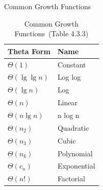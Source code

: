 \documentclass[handout]{beamer}
\begin{document}
        \begin{frame}[c,shrink]{Common Growth Functions}
            \begin{table}[tp]%
                \caption{Common Growth Functions\ (Table 4.3.3)}
                \label{cgf}\centering%
                \begin{tabular}{ll}
                    \hline%
                    Theta Form             & Name         \\\hline%
                    $\Theta(1)         $   & Constant     \\
                    $\Theta(\lg\lg{n}) $   & Log log      \\
                    $\Theta(\lg{n})    $   & Log          \\
                    $\Theta(n)         $   & Linear       \\
                    $\Theta(n\lg{n})   $   & n log n      \\
                    $\Theta(n_2)       $   & Quadratic    \\
                    $\Theta(n_3)       $   & Cubic        \\
                    $\Theta(n_k)       $   & Polynomial   \\
                    $\Theta(c_n)       $   & Exponential  \\
                    $\Theta(n!)        $   & Factorial    \\\hline%
                \end{tabular}
            \end{table}
        \end{frame}
        
\end{document}
